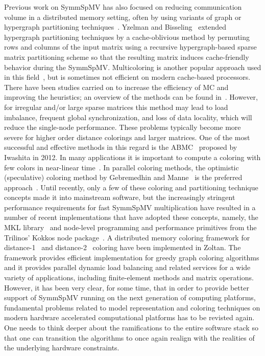  Previous
work on  \acrshort{SymmSpMV}  has also focused on reducing
communication volume in a distributed memory setting, often by using
variants of graph or hypergraph partitioning
techniques~\cite{Catalyurek:1999}. Yzelman and
Bisseling~\cite{doi:10.1137/080733243,Yzelman-thesis-2011} extended
hypergraph partitioning techniques by a cache-oblivious method by
permuting rows and columns of the input matrix using a recursive
hypergraph-based sparse matrix partitioning scheme so that the
resulting matrix induces cache-friendly behavior during the
\acrshort{SymmSpMV}. Multicoloring is another popular approach used in this
field~\cite{MC}, but is sometimes not efficient on modern cache-based
processors. There have been studies carried on to increase the
efficiency of \acrfull{MC} and
improving the heuristics; an overview of the methods can be found
in~\cite{dist_k_def,COLPACK,equitable_color}. However, 
for irregular and/or large sparse 
matrices this method may lead to load imbalance, frequent global synchronization, 
and loss of data locality, which will reduce the single-node performance. 
These problems typically become more severe for higher order distance
colorings and larger matrices.
One of the most
successful and effective methods in this regard is
the \acrfull{ABMC}~\cite{ABMC} proposed by Iwashita \etal in 2012. In
many applications it is important to compute a coloring with few
colors in near-linear time~\cite{doi:10.1137/13093426X}.
 In parallel coloring methods, the optimistic (speculative) coloring method by Gebremedhin
and Manne~\cite{gebremedhin2000scalable} is the preferred
approach~\cite{Boman:2016}.  Until recently, only a few of these
coloring and partitioning technique concepts made it into mainstream
software, but the increasingly stringent performance requirements for
fast \acrshort{SymmSpMV} multiplication have resulted in a number of recent
implementations that have adopted these concepts, namely,
the \acrshort{MKL} library~\cite{MKL} and node-level programming and
performance primitives from the Trilinos’ Kokkos node
package~\cite{kokkos}. A distributed memory coloring framework for
distance-1~\cite{BOZDAG2008515} and
distance-2~\cite{doi:10.1137/080732158} coloring have been implemented
in Zoltan. The framework provides efficient implementation for greedy
graph coloring algorithms and it provides parallel dynamic load
balancing and related services for a wide variety of applications,
including finite-element methods and matrix operations.  
%
However, it has been very clear, for some time, that in order to provide better
support of \acrshort{SymmSpMV} running on the next generation of
computing platforms, fundamental problems related to model
representation and coloring techniques on modern hardware accelerated
computational platforms has to be revisted again. One needs to think
deeper about the ramifications to the entire software stack so
that one can transition the algorithms to once again realign with the
realities of the underlying hardware constraints. 

